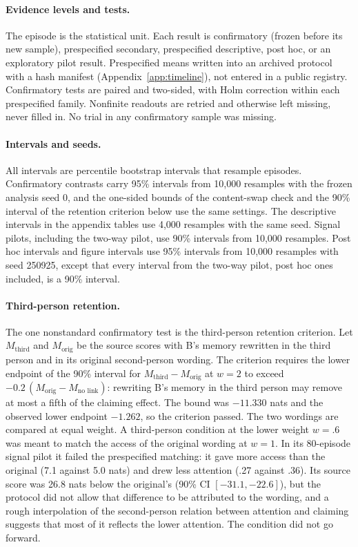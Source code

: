 \paragraph{Evidence levels and tests.}
The episode is the statistical unit. Each result is confirmatory (frozen
before its new sample), prespecified secondary, prespecified descriptive,
post hoc, or an exploratory pilot result. Prespecified means written into
an archived protocol with a hash manifest (Appendix~\ref{app:timeline}),
not entered in a public registry. Confirmatory tests are paired and
two-sided, with Holm correction within each prespecified family.
Nonfinite readouts are retried and otherwise left missing, never filled
in. No trial in any confirmatory sample was missing.

\paragraph{Intervals and seeds.}
All intervals are percentile bootstrap intervals that resample episodes.
Confirmatory contrasts carry 95\% intervals from 10,000 resamples with the
frozen analysis seed 0, and the one-sided bounds of the content-swap check
and the 90\% interval of the retention criterion below use the same
settings. The descriptive intervals in the appendix tables use 4,000
resamples with the same seed. Signal pilots, including the two-way
pilot, use 90\% intervals from 10,000 resamples. Post hoc intervals and
figure intervals use 95\% intervals from 10,000 resamples with seed
250925, except that every interval from the two-way pilot, post hoc ones
included, is a 90\% interval.

\paragraph{Third-person retention.}
The one nonstandard confirmatory test is the third-person retention
criterion. Let $M_{\mathrm{third}}$ and $M_{\mathrm{orig}}$ be the source
scores with B's memory rewritten in the third person and in its original
second-person wording. The criterion requires the lower endpoint of the
90\% interval for $M_{\mathrm{third}}-M_{\mathrm{orig}}$ at $w=2$ to
exceed $-0.2\,(M_{\mathrm{orig}}-M_{\text{no link}})$: rewriting B's
memory in the third person may remove at most a fifth of the claiming
effect. The bound was $-11.330$ nats and the observed lower endpoint $-1.262$,
so the criterion passed. The two wordings are compared at equal weight.
A third-person condition at the lower weight $w=.6$ was meant to match the
access of the original wording at $w=1$. In its 80-episode signal pilot
it failed the prespecified matching: it gave more access than the
original (7.1 against 5.0 nats) and drew less attention (.27 against
.36). Its source score was 26.8 nats below the original's (90\% CI
$[-31.1,-22.6]$), but the protocol did not allow that difference to be
attributed to the wording, and a rough interpolation of the
second-person relation between attention and claiming suggests that
most of it reflects the lower attention. The condition did not go
forward.

